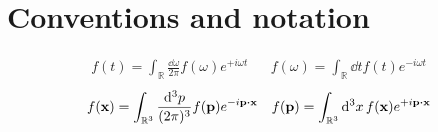 \section{Conventions and notation}


\begin{align}
	f(t)
	=
	\int_{\mathbb{R}}\frac{\dd{\omega}}{2\pi}
	f(\omega)
	e^{+i\omega t}
	&&
	f(\omega)
	=
	\int_{\mathbb{R}}\dd{t}
	f(t)
	e^{-i\omega t}
\end{align}
\begin{align}
	f(\vb{x})
	=
	\int_{\mathbb{R}^3}\frac{\dd[3]{p}}{(2\pi)^3}
	f(\vb{p})
	e^{-i\vb{p}\vdot\vb{x}}
	&&
	f(\vb{p})
	=
	\int_{\mathbb{R}^3}\dd[3]{x}
	f(\vb{x})
	e^{+i\vb{p}\vdot\vb{x}}
\end{align}